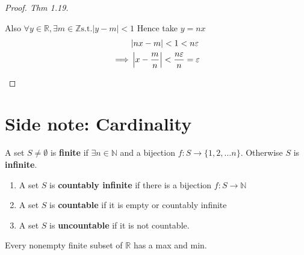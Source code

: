 \begin{proof}[Proof. Thm 1.19]
\begin{enumerate}
\begin{center}
\end{center}



Also $
\forall y \in \mathbb{R}, \exists m \in \mathbb{Z}
\text{s.t.} |y - m| < 1
$ 
Hence take $y = nx$
\begin{align*}
& |nx - m | < 1 < n \varepsilon \\
\implies & \left| x - \frac{m}{n} \right|  < \frac{n \varepsilon}{n} = \varepsilon
\end{align*}
    \end{enumerate}
\end{proof}

\newpage

\section*{Side note: Cardinality}

\begin{definition}[Finite]
    A set $S \neq \emptyset$ is \textbf{finite}
    if $\exists n \in \mathbb{N}$
    and a bijection 
    $f: S \to \{ 1, 2, \hdots n \} $. 
    Otherwise $S$ is \textbf{infinite}.
\end{definition}

\begin{definition}[Countability]
    \hfill
    \begin{enumerate}
        \item A set $S$ is 
\textbf{countably infinite}
if there is a bijection $f: S \to \mathbb{N}$
        \item A set $S$ is \textbf{countable} 
if it is empty
or countably infinite 
        \item A set $S$ is \textbf{uncountable} if
it is not countable.
    \end{enumerate}
\end{definition}

\begin{remark}
    Every nonempty finite subset of $\mathbb{R}$ has a max and min. 
\end{remark}

